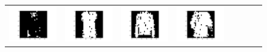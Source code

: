 \documentclass[12pt]{report}
\begin{document}
\begin{figure}[H]
\begin{tabular}{cccccccc}
  \includegraphics[width=0.1\linewidth]{qn2_i_60.png} &   \includegraphics[width=0.1\linewidth]{qn2_i_61.png} &
  \includegraphics[width=0.1\linewidth]{qn2_i_62.png} &   \includegraphics[width=0.1\linewidth]{qn2_i_63.png} \\
\end{tabular}
\end{figure}

\end{document}
